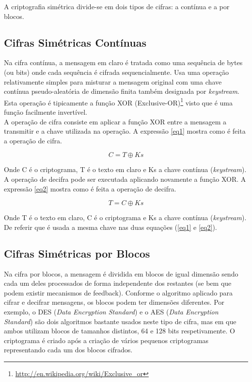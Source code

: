 \documentclass[a4paper,11pt,openright,oneside]{report}
\begin{document}
A criptografia simétrica divide-se em dois tipos de cifras: a contínua e a por blocos.

\subsection{Cifras Simétricas Contínuas}

Na cifra contínua, a mensagem em claro é tratada como uma sequência de bytes (ou bits) onde cada sequência é cifrada sequencialmente. Usa uma operação relativamente simples para misturar a mensagem original com uma chave contínua pseudo-aleatória de dimensão finita também designada por \textit{keystream}. Esta operação é tipicamente a função XOR (Exclusive-OR)\footnote{\url{http://en.wikipedia.org/wiki/Exclusive_or}} visto que é uma função facilmente invertível.\\

A operação de cifra consiste em aplicar a função XOR entre a mensagem a transmitir e a chave utilizada na operação. A expressão \ref{eq1} mostra como é feita a operação de cifra.

\begin{equation}
\label{eq1}
C = T \oplus Ks
\end{equation}

Onde C é o criptograma, T é o texto em claro e Ks a chave contínua (\textit{keystream}).\\

A operação de decifra pode ser executada aplicando novamente a função XOR. A expressão \ref{eq2} mostra como é feita a operação de decifra.

\begin{equation}
\label{eq2}
T = C \oplus Ks
\end{equation}

Onde T é o texto em claro, C é o criptograma e Ks a chave contínua (\textit{keystream}).\\

De referir que é usada a mesma chave nas duas equações (\ref{eq1} e \ref{eq2}).

\subsection{Cifras Simétricas por Blocos}

Na cifra por blocos, a mensagem é dividida em blocos de igual dimensão sendo cada um deles processados de forma independente dos restantes (se bem que podem existir mecanismos de feedback). Conforme o algoritmo aplicado para cifrar e decifrar mensagens, os blocos podem ter dimensões diferentes. Por exemplo, o DES (\textit{Data Encryption Standard}) e o AES (\textit{Data Encryption Standard}) são dois algoritmos bastante usados neste tipo de cifra, mas em que ambos utilizam blocos de tamanhos distintos, 64 e 128 bits respetivamente. O criptograma é criado após a criação de vários pequenos criptogramas representando cada um dos blocos cifrados.\\
\end{document}

